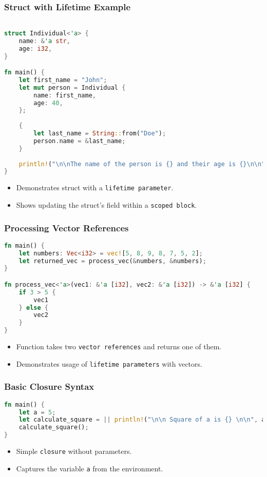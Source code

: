 \documentclass[aspectratio=169, table]{beamer}
\begin{document}
\begin{frame}[fragile]
\frametitle{Struct with Lifetime Example}
\begin{lstlisting}[language=Rust]

struct Individual<'a> {
	name: &'a str,
	age: i32,
}

fn main() {
	let first_name = "John";
	let mut person = Individual {
		name: first_name,
		age: 40,
	};
	
	{
		let last_name = String::from("Doe");
		person.name = &last_name;
	}
	
	println!("\n\nThe name of the person is {} and their age is {}\n\n", person.name, person.age);
}
\end{lstlisting}
\begin{itemize}
\item Demonstrates struct with a \texttt{lifetime\ parameter}.
\item Shows updating the struct's field within a \texttt{scoped\ block}.
\end{itemize}
\end{frame}

\begin{frame}[fragile]
\frametitle{Processing Vector References}
\begin{lstlisting}[language=Rust]
fn main() {
	let numbers: Vec<i32> = vec![5, 8, 9, 8, 7, 5, 2];
	let returned_vec = process_vec(&numbers, &numbers);
}

fn process_vec<'a>(vec1: &'a [i32], vec2: &'a [i32]) -> &'a [i32] {
	if 3 > 5 {
		vec1
	} else {
		vec2
	}
}
\end{lstlisting}
\begin{itemize}
\item Function takes two \texttt{vector\ references} and returns one of them.
\item Demonstrates usage of \texttt{lifetime\ parameters} with vectors.
\end{itemize}
\end{frame}


\begin{frame}[fragile]
\frametitle{Basic Closure Syntax}
\begin{lstlisting}[language=Rust]
fn main() {
	let a = 5;
	let calculate_square = || println!("\n\n Square of a is {} \n\n", a * a);
	calculate_square();
}
\end{lstlisting}
\begin{itemize}
\item Simple \texttt{closure} without parameters.
\item Captures the variable \texttt{a} from the environment.
\end{itemize}
\end{frame}
\end{document}
